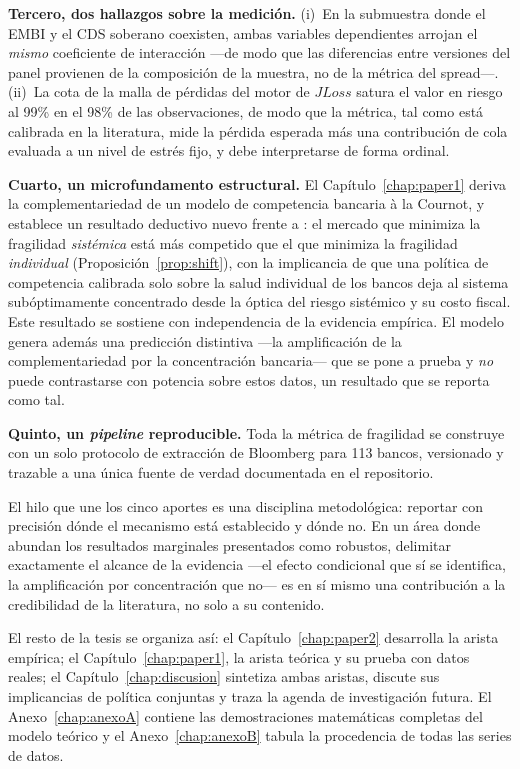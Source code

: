 \textbf{Tercero, dos hallazgos sobre la medición.} (i)~En la submuestra donde el EMBI y el CDS soberano coexisten, ambas variables dependientes arrojan el \emph{mismo} coeficiente de interacción —de modo que las diferencias entre versiones del panel provienen de la composición de la muestra, no de la métrica del spread—. (ii)~La cota de la malla de pérdidas del motor de $JLoss$ satura el valor en riesgo al 99\% en el 98\% de las observaciones, de modo que la métrica, tal como está calibrada en la literatura, mide la pérdida esperada más una contribución de cola evaluada a un nivel de estrés fijo, y debe interpretarse de forma ordinal.

\textbf{Cuarto, un microfundamento estructural.} El Capítulo~\ref{chap:paper1} deriva la complementariedad de un modelo de competencia bancaria à la Cournot, y establece un resultado deductivo nuevo frente a \citet{MMR2010}: el mercado que minimiza la fragilidad \emph{sistémica} está más competido que el que minimiza la fragilidad \emph{individual} (Proposición~\ref{prop:shift}), con la implicancia de que una política de competencia calibrada solo sobre la salud individual de los bancos deja al sistema subóptimamente concentrado desde la óptica del riesgo sistémico y su costo fiscal. Este resultado se sostiene con independencia de la evidencia empírica. El modelo genera además una predicción distintiva —la amplificación de la complementariedad por la concentración bancaria— que se pone a prueba y \emph{no} puede contrastarse con potencia sobre estos datos, un resultado que se reporta como tal.

\textbf{Quinto, un \textit{pipeline} reproducible.} Toda la métrica de fragilidad se construye con un solo protocolo de extracción de Bloomberg para 113 bancos, versionado y trazable a una única fuente de verdad documentada en el repositorio.

El hilo que une los cinco aportes es una disciplina metodológica: reportar con precisión dónde el mecanismo está establecido y dónde no. En un área donde abundan los resultados marginales presentados como robustos, delimitar exactamente el alcance de la evidencia —el efecto condicional que sí se identifica, la amplificación por concentración que no— es en sí mismo una contribución a la credibilidad de la literatura, no solo a su contenido.

El resto de la tesis se organiza así: el Capítulo~\ref{chap:paper2} desarrolla la arista empírica; el Capítulo~\ref{chap:paper1}, la arista teórica y su prueba con datos reales; el Capítulo~\ref{chap:discusion} sintetiza ambas aristas, discute sus implicancias de política conjuntas y traza la agenda de investigación futura. El Anexo~\ref{chap:anexoA} contiene las demostraciones matemáticas completas del modelo teórico y el Anexo~\ref{chap:anexoB} tabula la procedencia de todas las series de datos.
